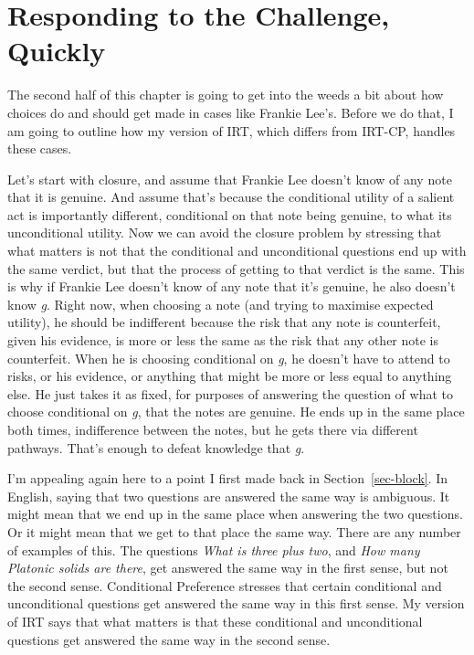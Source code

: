 \documentclass[
  10pt,
  letterpaper,
  twoside]{scrbook}
\begin{document}
\section{Responding to the Challenge, Quickly}\label{sec-tiesresponse}

The second half of this chapter is going to get into the weeds a bit
about how choices do and should get made in cases like Frankie Lee's.
Before we do that, I am going to outline how my version of IRT, which
differs from IRT-CP, handles these cases.

Let's start with closure, and assume that Frankie Lee doesn't know of
any note that it is genuine. And assume that's because the conditional
utility of a salient act is importantly different, conditional on that
note being genuine, to what its unconditional utility. Now we can avoid
the closure problem by stressing that what matters is not that the
conditional and unconditional questions end up with the same verdict,
but that the process of getting to that verdict is the same. This is why
if Frankie Lee doesn't know of any note that it's genuine, he also
doesn't know \emph{g}. Right now, when choosing a note (and trying to
maximise expected utility), he should be indifferent because the risk
that any note is counterfeit, given his evidence, is more or less the
same as the risk that any other note is counterfeit. When he is choosing
conditional on \emph{g}, he doesn't have to attend to risks, or his
evidence, or anything that might be more or less equal to anything else.
He just takes it as fixed, for purposes of answering the question of
what to choose conditional on \emph{g}, that the notes are genuine. He
ends up in the same place both times, indifference between the notes,
but he gets there via different pathways. That's enough to defeat
knowledge that \emph{g}.

I'm appealing again here to a point I first made back in
Section~\ref{sec-block}. In English, saying that two questions are
answered the same way is ambiguous. It might mean that we end up in the
same place when answering the two questions. Or it might mean that we
get to that place the same way. There are any number of examples of
this. The questions \emph{What is three plus two}, and \emph{How many
Platonic solids are there}, get answered the same way in the first
sense, but not the second sense. Conditional Preference stresses that
certain conditional and unconditional questions get answered the same
way in this first sense. My version of IRT says that what matters is
that these conditional and unconditional questions get answered the same
way in the second sense.
\end{document}
